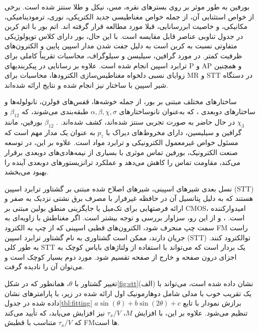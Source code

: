 ‌بورفین به طور موثر بر روی بسترهای نقره، مس، نیکل و طلا سنتز شده است. برخی از خواص استثنایی آن، از جمله خواص مغناطیسی جدید الکتریکی، نوری، ترمودینا‌میکی، مکانیکی، و خاصیت ابررسانایی، قبلا مورد مطالعه قرار گرفته اند. اتم بور با اتم کربن در جدول تناوبی عناصر قابل مقایسه است. با این حال، بور دارای کلاس توپولوژیکی متفاوتی نسبت به کربن است به دلیل جفت شدن مدار اسپین پایین  و الکترون‌های ظرفیت کمتر. در مورد گرافین، سیلیسن و سیلوگراف، محاسبات تقریباً کاملی برای ترابرد اسپین\cite{zhouSymmetrydependentSpinchargeTransport2015, maherSpindependentTransportSpin2022, chenElectronicTransportGraphenebased2010} انجام شده است. علاوه بر رسانایی در پیکربندیهای \gls{P} و \gls{AP} و همچنین زوایای نسبی دلخواه مغناطیس‌سازی الکترودها، محاسبات برای \gls{MR} و \gls{STT} در دستگاه شیر اسپین با ساختار  نیز انجام شده و نتایج ارائه شده‌اند. 

ساختارهای مختلف مبتنی بر بور، از جمله خوشه‌ها، قفس‌های فولرن، نانولوله‌ها و ساختارهای دوبعدی \cite{wuTwoDimensionalBoronMonolayer2012, penevPolymorphismTwoDimensionalBoron2012, zhaiObservationAllboronFullerene2014}، که به‌عنوان نانوساختارهای $\alpha,\beta,\chi,\sigma$ طبقه‌بندی ‌می‌شوند، که $\beta_{12}$ و $\chi_{3}$ در حال حاضر به صورت تجربی سنتز شده‌اند، کشف شده‌اند. \cite{mannixSynthesisBorophenesAnisotropic2015, fengDirectEvidenceMetallic2016}. $\beta_{12}$ ‌بورفین، مانند گرافین و سیلیسین، دارای مخروط‌های دیراک با $p_z$ به عنوان یک مدار مهم است که مسئول خواص غیرمعمول الکترونیکی و ترابرد مواد \cite{tangNovelPrecursorsBoron2007} است. علاوه بر این، در توسعه صنعت الکترونیک، ‌بورفین تماس موثری با بسیاری از نیمه‌هادی‌های دوبعدی برقرار ‌‌می‌‌کند، مقاومت تماس را کاهش ‌‌می‌‌دهد و عملکرد ترانزیستورهای دوبعدی آینده را بهبود ‌‌می‌‌بخشد.

نسل بعدی شیرهای اسپینی، شیرهای اصلاح شده مبتنی بر گشتاور ترابرد اسپین (\gls{STT}) هستند که به دلیل پتانسیل آن در حافظه غیرفرار با مصرف برق نشتی نزدیک به صفر و ارائه فرصتهایی برای تک‌میل یا جایگزینی منطق بولین مبتنی بر \gls{CMOS}، ا‌میدوارکننده است. ، و از این رو، سزاوار بررسی و توجه بیشتر است. اگر مغناطش با زاویه‌ای به سمت چپ منحرف شود، الکترون‌های قطبی اسپینی که از چپ به الکترود \gls{FM} راست جریان دارند، ممکن است گشتاوری به نام گشتاور ترابرد اسپین (\gls{STT}) توالکترود کنند. به طور کلی \gls{STT} یک بردار است که ‌‌می‌‌تواند با استفاده از ولتاژهای بایاس کوچک به اجزای درون صفحه و خارج از صفحه تقسیم شود. مورد دوم بسیار کوچک است و ‌‌می‌‌توان آن را نادیده گرفت. 

تغییر گشتاور با $\theta$، همانطور که در شکل\ref{fig:stt}(الف) نشان داده شده است، ‌‌می‌‌تواند با یک تقریب خوب با مدلی شامل دو‌هارمونیک اول ارائه شده در زیر، با پارامترهای نشان داده شده در جدول\ref{tbl:fitting} برازش نمودار  با تابع $a\sin(\theta)+b\sin(2\theta)+c$ تنظیم ‌می‌‌شود. علاوه بر این، با افزایش $M$، $\tau_{x}/V$ نیز افزایش ‌می‌یابد، که تأیید ‌می‌کند که $\tau_{x}/V$ متناسب با قطبش \gls{FM}‌ها است.

